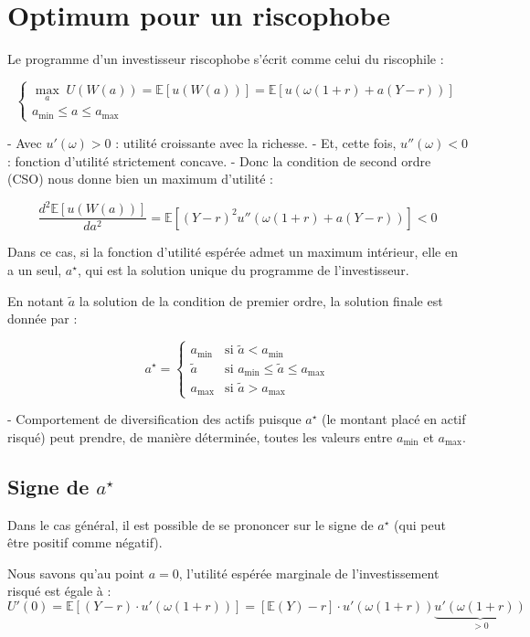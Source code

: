\documentclass[a4paper, 12pt]{report}
\begin{document}
\section{Optimum pour un riscophobe}

Le programme d'un investisseur riscophobe s'écrit comme celui du riscophile :

\[
\begin{cases}
\underset{a}\max \; U(W(a)) = \mathbb{E}[u(W(a))] = \mathbb{E}[u(\omega(1 + r) + a(Y - r))] \\
a_{\text{min}} \leq a \leq a_{\text{max}}
\end{cases}
\]

- Avec \( u'(\omega) > 0 \) : utilité croissante avec la richesse.
- Et, cette fois, \( u''(\omega) < 0 \) : fonction d'utilité strictement concave.
- Donc la condition de second ordre (CSO) nous donne bien un maximum d'utilité :

\[
\frac{d^2 \mathbb{E}[u(W(a))]}{da^2} = \mathbb{E}\left[ (Y - r )^2 u''(\omega(1 + r) + a(Y - r))\right]  < 0
\]

Dans ce cas, si la fonction d'utilité espérée admet un maximum intérieur, elle en a un seul, \( a^{\star}\), qui est la solution unique du programme de l'investisseur.

En notant \( \tilde{a} \) la solution de la condition de premier ordre, la solution finale est donnée par :

\[
a^{\star} = 
\begin{cases} 
	a_{\text{min}} & \text{si } \tilde{a} < a_{\text{min}} \\
	\tilde{a} & \text{si } a_{\text{min}} \leq \tilde{a} \leq a_{\text{max}} \\
	a_{\text{max}} & \text{si } \tilde{a} > a_{\text{max}}
\end{cases}
\]

- Comportement de diversification des actifs puisque \( a^{\star} \) (le montant placé en actif risqué) peut prendre, de manière déterminée, toutes les valeurs entre \( a_{\text{min}} \) et \( a_{\text{max}} \).

\subsection{Signe de \( a^{\star} \)}

Dans le cas général, il est possible de se prononcer sur le signe de \( a^{\star} \) (qui peut être positif comme négatif).

Nous savons qu'au point \( a = 0 \), l'utilité espérée marginale de l'investissement risqué est égale à :
\[
U'(0) = \mathbb{E}\left[ (Y - r)\cdot u'(\omega(1 + r))\right]  = \left[ \mathbb{E}(Y) - r\right] \cdot u'(\omega(1 + r))\underbrace{u'(\omega(1 + r))}_{>0}
\]
\end{document}
